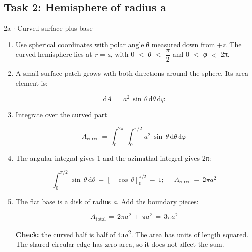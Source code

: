 \documentclass[11pt]{article}
\begin{document}
\begin{keepsection}\subsection{Task 2: Hemisphere of radius a}

\begin{workedbox}{2a \ensuremath{\cdot} Curved surface plus base}
\begin{enumerate}
\item Use spherical coordinates with polar angle \textit{θ} measured down from +\textit{z}. The curved hemisphere lies at \textit{r} = \textit{a}, with 0 \ensuremath{\leq} \textit{θ} \ensuremath{\leq} {\small\ensuremath{\dfrac{π}{2}}} and 0 \ensuremath{\leq} \textit{φ} \ensuremath{<} 2π.
\item {}
A small surface patch grows with both directions around the sphere. Its area element is:

\begin{equation*}\mathrm{d}{A}\, =\, {a}^{2}\, \sin \, {θ}\, \mathrm{d}{θ}\, \mathrm{d}{φ}\end{equation*}
\item {}
Integrate over the curved part:

\begin{equation*}{A}_{\text{curve}}\, =\, \int_{0}^{2π} \, \int_{0}^{π/2} \, {a}^{2}\, \sin \, {θ}\, \mathrm{d}{θ}\, \mathrm{d}{φ}\end{equation*}
\item {}
The angular integral gives 1 and the azimuthal integral gives 2π:

\begin{equation*}\int_{0}^{π/2} \, \sin \, {θ}\, \mathrm{d}{θ}\, =\, [-\cos \, {θ}]_{0}^{π/2}\, =\, 1;\, \quad \, {A}_{\text{curve}}\, =\, 2π{a}^{2}\end{equation*}
\item {}
The flat base is a disk of radius \textit{a}. Add the boundary pieces:

\begin{equation*}{A}_{\text{total}}\, =\, 2π{a}^{2}\, +\, π{a}^{2}\, =\, 3π{a}^{2}\end{equation*}

\textbf{Check:} the curved half is half of 4π\textit{a}\textsuperscript{2}. The area has units of length squared. The shared circular edge has zero area, so it does not affect the sum.
\end{enumerate}
\end{workedbox}

\end{keepsection}
\end{document}
